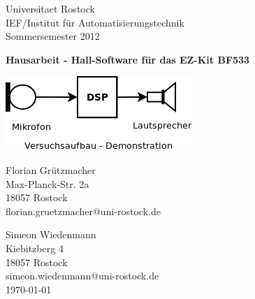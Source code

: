 \documentclass[a4paper,12pt,fontsize=12,DIV=12]{scrartcl}
\begin{document}
\begin{titlepage}
\begin{small}
\vfill {Universitaet Rostock\\ 
IEF/Institut für Automatisierungstechnik\\ 
Sommersemester 2012}
\end{small}


\begin{center}
\begin{Large}
\vfill {\textsf{\textbf{
	Hausarbeit - Hall-Software für das EZ-Kit BF533
}}}
\end{Large}
\end{center}

\begin{center}
\vspace{2.0cm}
\includegraphics[scale=0.8]{Bilder/Versuchsaufbau_Demonstration.png}
\end{center}

\begin{small}
\vfill Florian Grützmacher \\ Max-Planck-Str. 2a \\  18057 Rostock \\  florian.gruetzmacher@uni-rostock.de\\ 
\end{small}

\vspace{-5.0cm}

\begin{small}
\vfill Simeon Wiedenmann \\ Kiebitzberg 4 \\  18057 Rostock \\  simeon.wiedenmann@uni-rostock.de\\ 
\newline
\today
\end{small}

\end{titlepage}


\tableofcontents
\thispagestyle{empty}

\clearpage
\end{document}
